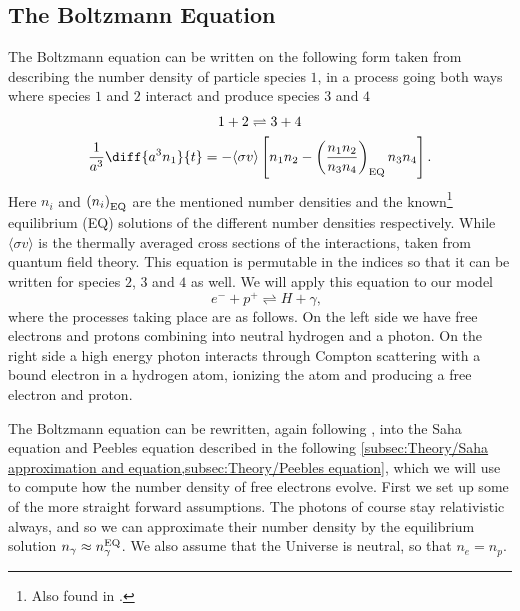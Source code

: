 \documentclass[10pt,a4paper]{article}
\begin{document}
\subsection{The Boltzmann Equation}
\label{subsec:Theory/Boltzmann eq}
The Boltzmann equation can be written on the following form taken from \cite[p. 61]{Dodelson} describing the number density of particle species $1$, in a process going both ways where species $1$ and $2$ interact and produce species $3$ and $4$
\begin{gather}
    1+2  \rightleftharpoons 3+ 4 \notag
    \\
    \frac{1}{a^3}\diff{a^3n_1}{t} = - \langle \sigma v \rangle \left[n_1n_2 - \left(\frac{n_1n_2}{n_3n_4}\right)_{\rm{EQ}}n_3n_4\right].
    \label{eq:Boltzmann species}
\end{gather}
Here $n_i$ and $\left(n_i\right)_{\rm{EQ}}$ are the mentioned number densities and the known\footnote{Also found in \cite[p. 61]{Dodelson}.} equilibrium (EQ) solutions of the different number densities respectively. While $\langle \sigma v \rangle$ is the thermally averaged cross sections of the interactions, taken from quantum field theory. This equation is permutable in the indices so that it can be written for species $2$, $3$ and $4$ as well. We will apply this equation to our model 
\begin{equation}
    \quad e^{-} + p^{+} \rightleftharpoons H + \gamma,
    \label{eq:process}
\end{equation}
where the processes taking place are as follows. On the left side we have free electrons and protons combining into neutral hydrogen and a photon. On the right side a high energy photon interacts through Compton scattering with a bound electron in a hydrogen atom, ionizing the atom and producing a free electron and proton.

The Boltzmann equation can be rewritten, again following \cite{Dodelson}, into the Saha equation and Peebles equation described in the following \cref{subsec:Theory/Saha approximation and equation,subsec:Theory/Peebles equation}, which we will use to compute how the number density of free electrons evolve. First we set up some of the more straight forward assumptions. The photons of course stay relativistic always, and so we can approximate their number density by the equilibrium solution $n_\gamma \approx n_\gamma^{\rm{EQ}}$. We also assume that the Universe is neutral, so that $n_e = n_p$. 
\end{document}
